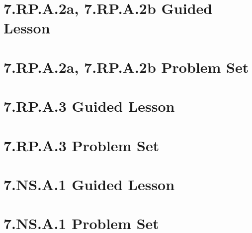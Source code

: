 \documentclass[a4paper,12pt]{article}
\title{}
\date{}
\newcommand{\startPageNumbers}{\setcounter{page}{1}}
\begin{document}


\hypertarget{toc}{}
\tableofcontents
\newpage
\startPageNumbers

\pagestyle{fancy}  %

\newpage
\section{7.RP.A.2a, 7.RP.A.2b Guided Lesson}


\newpage
\section{7.RP.A.2a, 7.RP.A.2b Problem Set}


\newpage
\section{7.RP.A.3 Guided Lesson}


\newpage
\section{7.RP.A.3 Problem Set}


\newpage
\section{7.NS.A.1 Guided Lesson}


\newpage
\section{7.NS.A.1 Problem Set}


\newpage
\end{document}
